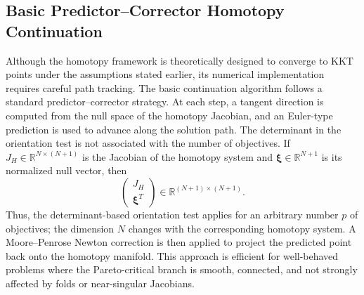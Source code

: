 \documentclass[11pt,pdflatex,sn-mathphys-ay]{sn-jnl}%
\theoremstyle{definition}
\theoremstyle{thmstyleone}%
\theoremstyle{thmstyletwo}%
\theoremstyle{thmstylethree}%
\newcommand{\add}[1]{\textcolor{revisionblue}{#1}}
\begin{document}
	
	\subsection{Basic Predictor--Corrector Homotopy Continuation}
	
	Although the homotopy framework is theoretically designed to converge to KKT points under the assumptions stated earlier, its numerical implementation requires careful path tracking. 
	The basic continuation algorithm follows a standard predictor--corrector strategy. 
	At each step, a tangent direction is computed from the null space of the homotopy Jacobian, and an Euler-type prediction is used to advance along the solution path. \add{The determinant in the orientation test is not associated with the number of objectives. If
		$J_H\in\mathbb{R}^{N\times(N+1)}$ is the Jacobian of the homotopy
		system and $\boldsymbol{\xi}\in\mathbb{R}^{N+1}$ is its normalized null vector, then
		\[
		\begin{pmatrix}
			J_H\\
			\boldsymbol{\xi}^{T}
		\end{pmatrix}
		\in\mathbb{R}^{(N+1)\times(N+1)}.
		\]
		Thus, the determinant-based orientation test applies for an arbitrary
		number $p$ of objectives; the dimension $N$ changes with the
		corresponding homotopy system.} 
	A Moore--Penrose Newton correction is then applied to project the predicted point back onto the homotopy manifold. 
	This approach is efficient for well-behaved problems where the Pareto-critical branch is smooth, connected, and not strongly affected by folds or near-singular Jacobians.
	
\end{document}
